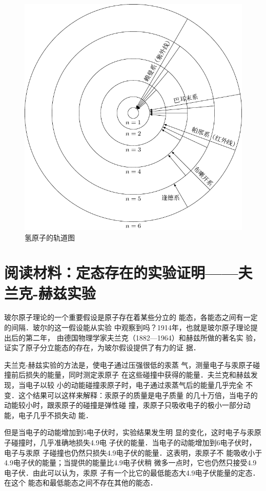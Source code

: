 \begin{figure}[htbp]
    \centering
    \includegraphics{fig/C/8-5.pdf}
    \caption{氢原子的轨道图}\label{fig_C_8-5}
\end{figure}

\section*{阅读材料：定态存在的实验证明——夫兰克-赫兹实验}
玻尔原子理论的一个重要假设是原子存在着某些分立的
能态，各能态之间有一定的间隔．玻尔的这一假设能从实验
中观察到吗？1914年，也就是玻尔原子理论提出后的第二年，
由德国物理学家夫兰克（1882—1964）和赫兹所做的著名实
验，证实了原子分立能态的存在，为玻尔假设提供了有力的证
据．

夫兰克-赫兹实验的方法是，使电子通过压强很低的汞蒸
气，测量电子与汞原子碰撞前后损失的能量，同时测定汞原子
在这些碰撞中获得的能量．夫兰克和赫兹发现，当电子以较
小的动能碰撞汞原子时，电子通过汞蒸气后的能量几乎完全
不变．这个结果可以这样来解释：汞原子的质量是电子质量
的几十万倍，当电子的动能较小时，跟汞原子的碰撞是弹性碰
撞，汞原子只吸收电子的极小一部分动能，电子几乎不损失动
能．

但是当电子的动能增加到5电子伏时，实验结果发生明
显的变化，这时电子与汞原子碰撞时，几乎准确地损失4.9电
子伏的能量．当电子的动能增加到6电子伏时，电子与汞原
子碰撞也仍然只损失4.9电子伏的能量．这表明，汞原子不
能吸收小于4.9电子伏的能量；当提供的能量比4.9电子伏稍
微多一点时，它也仍然只接受4.9电子伏．由此可以认为，汞原
子有一个比它的最低能态大4.9电子伏能量的定态．在这个
能态和最低能态之间不存在其他的能态．

